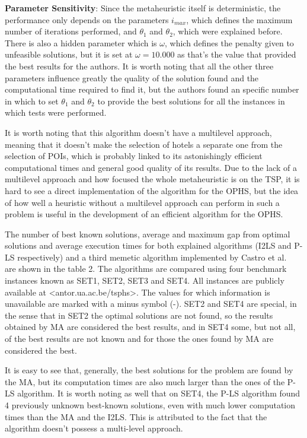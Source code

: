     \textbf{Parameter Sensitivity}: Since the metaheuristic itself is deterministic, the performance only depends on the parameters $i_{max}$, which defines the maximum number of iterations performed, and $\theta_1$ and $\theta_2$, which were explained before. There is also a hidden parameter which is $\omega$, which defines the penalty given to unfeasible solutions, but it is set at $\omega=10.000$ as that's the value that provided the best results for the authors. It is worth noting that all the other three parameters influence greatly the quality of the solution found and the computational time required to find it, but the authors found an specific number in which to set $\theta_1$ and $\theta_2$ to provide the best solutions for all the instances in which tests were performed.
    
    It is worth noting that this algorithm doesn't have a multilevel approach, meaning that it doesn't make the selection of hotels a separate one from the selection of POIs, which is probably linked to its astonishingly efficient computational times and general good quality of its results. Due to the lack of a multilevel approach and how focused the whole metaheuristic is on the TSP, it is hard to see a direct implementation of the algorithm for the OPHS, but the idea of how well a heuristic without a multilevel approach can perform in such a problem is useful in the development of an efficient algorithm for the OPHS.

    The number of best known solutions, average and maximum gap from optimal solutions and average execution times for both explained algorithms (I2LS and P-LS respectively) and a third memetic algorithm implemented by Castro et al.~\cite{castro2013} are shown in the table 2. The algorithms are compared using four benchmark instances known as SET1, SET2, SET3 and SET4. All instances are publicly available at \textless antor.ua.ac.be/tsphs\textgreater. The values for which information is unavailable are marked with a minus symbol (-). SET2 and SET4 are special, in the sense that in SET2 the optimal solutions are not found, so the results obtained by MA are considered the best results, and in SET4 some, but not all, of the best results are not known and for those the ones found by MA are considered the best.
    
    It is easy to see that, generally, the best solutions for the problem are found by the MA, but its computation times are also much larger than the ones of the P-LS algorithm. It is worth noting as well that on SET4, the P-LS algorithm found 4 previously unknown best-known solutions, even with much lower computation times than the MA and the I2LS. This is attributed to the fact that the algorithm doesn't possess a multi-level approach.
    
